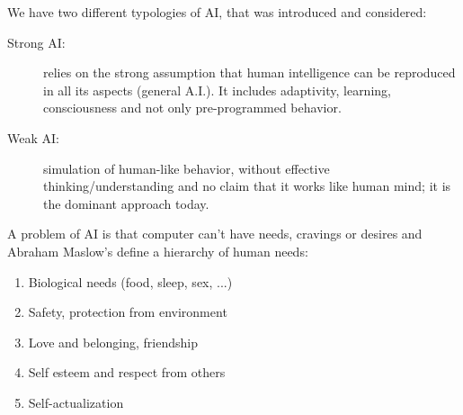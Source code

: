 We have two different typologies of AI, that was introduced and considered:
\begin{description}
    \item [Strong AI: ] relies on the strong assumption that human intelligence can be reproduced
                        in all its aspects (general A.I.).\newline
                        It includes adaptivity, learning, consciousness and not only pre-programmed behavior.
    \item [Weak AI: ]   simulation of human-like behavior, without effective thinking/understanding and 
                        no claim that it works like human mind; it is the dominant approach today.
\end{description}
A problem of AI is that computer can't have needs, cravings or desires and Abraham Maslow's define 
a hierarchy of human needs:
\begin{enumerate}
    \item Biological needs (food, sleep, sex, ...)
    \item Safety, protection from environment
    \item Love and belonging, friendship
    \item Self esteem and respect from others
    \item Self-actualization
\end{enumerate}
